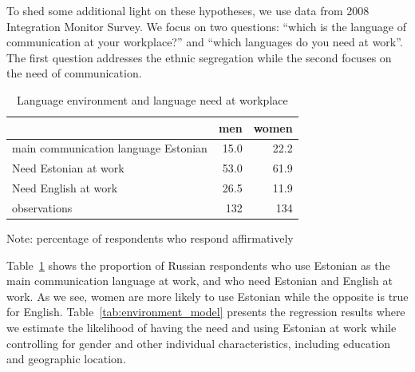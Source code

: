 \documentclass[12pt, a4paper]{article}
\begin{document}
To shed some additional light on these hypotheses, we use data
from 2008 Integration Monitor Survey.  We focus on
two questions: ``which is the language of communication at your
workplace?'' and ``which languages do you need at work''.  The first
question addresses the ethnic segregation while the second focuses on
the need of communication.  

\begin{table}[t]
	\centering
	\caption{Language environment and language need at workplace}
	\label{tab:environment_descriptive}
	\begin{tabular}{lrr}
		\toprule
		                                     & men  & women \\
		\midrule
		main communication language Estonian & 15.0 & 22.2  \\
		Need Estonian at work                & 53.0 & 61.9  \\
		Need English  at work                & 26.5 & 11.9  \\
		\midrule
		observations                         & 132  & 134   \\
		\bottomrule
	\end{tabular}
	\begin{flushleft}
		Note: percentage of respondents who respond affirmatively
	\end{flushleft}
\end{table}

Table~\ref{tab:environment_descriptive} shows the proportion of
Russian respondents who use Estonian as the main communication language at work, and
who need Estonian and English at work.  As we see, women are more likely to
use Estonian while the opposite is true for English.
Table~\ref{tab:environment_model} presents the regression results
where we estimate the likelihood of having the need and using Estonian at work
while
controlling for gender and other individual
characteristics, including education and geographic location.
\end{document}
